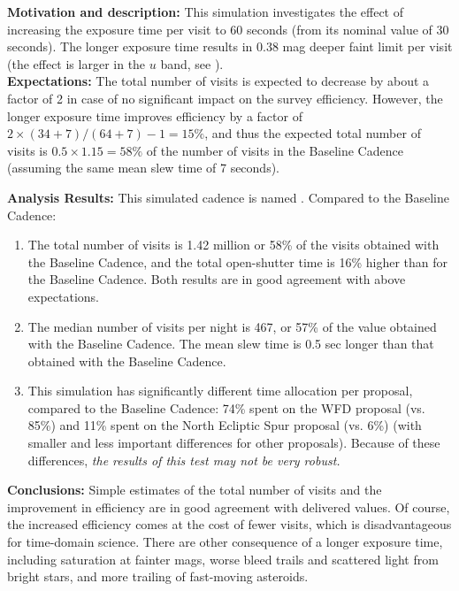 
{\bf Motivation and description:} This simulation investigates the
effect of increasing the exposure time per visit to 60 seconds (from
its nominal value of 30 seconds). The longer exposure time results in
0.38 mag deeper faint limit per visit (the effect is larger in the
$u$ band, see ). \\

{\bf Expectations:} The total number of visits is expected to decrease by about
a factor of 2 in case of no significant impact on the survey efficiency.
However, the longer exposure time improves efficiency by a factor of
$2\times(34+7)/(64+7)-1=15\%$, and thus the expected total number of visits is
$0.5\times1.15 = 58\%$ of the number of visits in the Baseline Cadence (assuming
the same mean slew time of 7 seconds).

{\bf Analysis Results:} This simulated cadence is named .
Compared to the Baseline Cadence:
\begin{enumerate}
\item The total number of visits is 1.42 million or 58\% of the visits
obtained with the Baseline Cadence, and the total open-shutter time is
16\% higher than for the Baseline Cadence. Both results are in good
agreement with above expectations.
\item The median number of visits per night is 467, or 57\% of the
value obtained with the Baseline Cadence. The mean slew time is 0.5 sec
longer than that obtained with the Baseline Cadence.
\item This simulation has significantly different time allocation per
proposal, compared to the Baseline Cadence: 74\% spent on the WFD
proposal (vs. 85\%) and 11\%  spent on the North Ecliptic Spur proposal
(vs. 6\%)  (with smaller and less important differences for other
proposals). Because of these differences, {\it the results of this
test may not be very robust.}
\end{enumerate}

{\bf Conclusions:}
Simple estimates of the total number of visits and the
improvement in efficiency are in good agreement with delivered values. Of
course, the increased efficiency comes at the cost of fewer visits, which is
disadvantageous for time-domain science. There are other consequence of a longer
exposure time, including saturation at fainter mags, worse bleed trails and
scattered light from bright stars, and more trailing of fast-moving asteroids.

